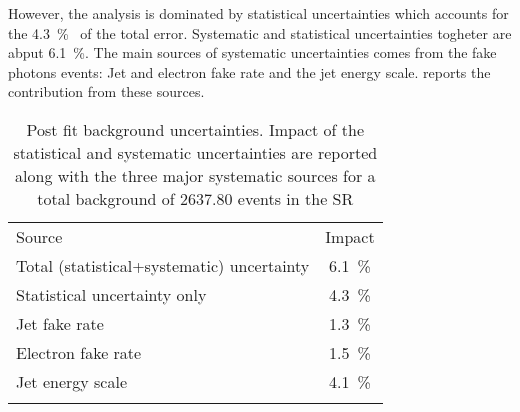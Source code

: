 
However, the \mph analysis is dominated by statistical uncertainties which accounts for the \SI{4.3}{\percent}~\cite{paperMP} of the total error. Systematic and statistical uncertainties togheter are abput \SI{6.1}{\percent}. The main sources of systematic uncertainties comes from the fake photons events: Jet and electron fake rate and the jet energy scale. \Tab{\ref{table:sys}} reports the contribution from these sources.

\begin{table}[pt]
\centering
\begin{tabular}{lc}
\noalign{\smallskip}\toprule\noalign{\smallskip}
Source & Impact\\
\noalign{\smallskip}\midrule\noalign{\smallskip}
Total (statistical+systematic) uncertainty & \SI{6.1}{\percent}\\
Statistical uncertainty only & \SI{4.3}{\percent}\\
Jet fake rate & \SI{1.3}{\percent}\\
Electron fake rate& \SI{1.5}{\percent}\\ 
Jet energy scale& \SI{4.1}{\percent}\\
\noalign{\smallskip}\bottomrule\noalign{\smallskip}
\end{tabular}
\caption{Post fit background uncertainties. Impact of the statistical and systematic uncertainties are reported along with the three major systematic sources for a total background of $2637.80$ events in the SR}
\label{table:sys}
\end{table}

